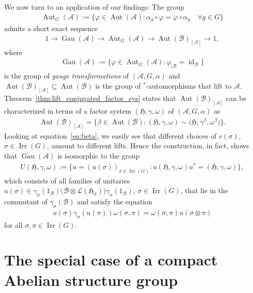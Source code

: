 \documentclass[10pt,a4paper]{amsart}
\numberwithin{equation}{section}
\newcommand*{\tensor}{\otimes}		%
\DeclareMathOperator{\id}{id}		%
\DeclareMathOperator{\Aut}{Aut}
\DeclareMathOperator{\Gau}{Gau}
\newcommand*{\Star}{$^*$\nobreakdash}
\newcommand*{\hilb}{\mathfrak}		%
\newcommand*{\alg}{\mathcal}		%
\newcommand*{\hH}{\hilb{H}}			%
\newcommand*{\one}{1}				%
\newcommand*{\aA}{\alg{A}}			%
\newcommand*{\aB}{\alg{B}} 			%
\newcommand*{\End}{\mathcal{L}} %
\DeclareMathOperator{\Irrep}{Irr} 			%
\begin{document}
We now turn to an application of our findings:
The group
\begin{gather*}
	\Aut_G(\aA) := \bigl\{ \varphi \in \Aut(\aA)\colon \alpha_g \circ \varphi = \varphi\circ \alpha_g \quad \forall g \in G \bigr\}
\end{gather*}
admits a short exact sequence
\begin{gather}\label{eq:AtiyahNCgroup}
	1 \longrightarrow \Gau(\aA) \longrightarrow \Aut_G(\aA)\longrightarrow \Aut(\aB)_{[\aA]} \longrightarrow 1,
\end{gather}
where
\begin{gather*}
	\Gau(\aA) := \bigl\{\varphi \in \Aut_G(\aA)\colon \varphi_{\mid \aB} = \id_\aB \bigr\}
\end{gather*}
is the group of \emph{gauge transformations} of $(\aA, G, \alpha)$ and $\Aut(\aB)_{[\aA]} \subseteq \Aut(\aB)$ is the group of \Star-automorphisms that lift to $\aA$.
Theorem~\ref{thm:lift_conjugated_factor_sys} states that $\Aut(\aB)_{[\aA]}$ can be characterized in terms of a factor system $(\hH, \gamma, \omega)$ of $(\aA, G, \alpha)$ as
\begin{gather*}
	\Aut(\aB)_{[\aA]} = \bigl\{ \beta \in \Aut(\aB)\colon (\hH,\gamma, \omega) \sim \big(\hH, \gamma^\beta, \omega^\beta\big) \bigr\}.
\end{gather*}
Looking at equation~\eqref{eq:beta}, we easily see that different choices of $v(\sigma)$, $\sigma \in \Irrep(G)$, amount to different lifts.
Hence the construction, in fact, shows that $\Gau(\aA)$ is isomorphic to the group
\begin{gather*}
	U(\hH, \gamma, \omega) := \bigl\{ u = (u(\sigma))_{\sigma \in \Irrep(G)}\colon u(\hH, \gamma, \omega)u^* = (\hH, \gamma, \omega) \bigr\},
\end{gather*}
which consists of all families of unitaries $u(\sigma) \in \gamma_\sigma(\one_\aB) \big( \aB \tensor \End(\hH_\sigma) \big) \gamma_\sigma(\one_\aB)$, $\sigma \in \Irrep(G)$, that lie in the commutant of $\gamma_\sigma(\aB)$ and satisfy the equation
\begin{gather*}
	u(\sigma) \gamma_\sigma ( u(\pi)) \omega(\sigma, \pi) = \omega(\sigma, \pi) u(\sigma \tensor \pi)
\end{gather*}
for all $\sigma, \pi \in \Irrep(G)$.


\section{The special case of a compact Abelian structure group}\label{sec:cpt_abelian}
\end{document}
